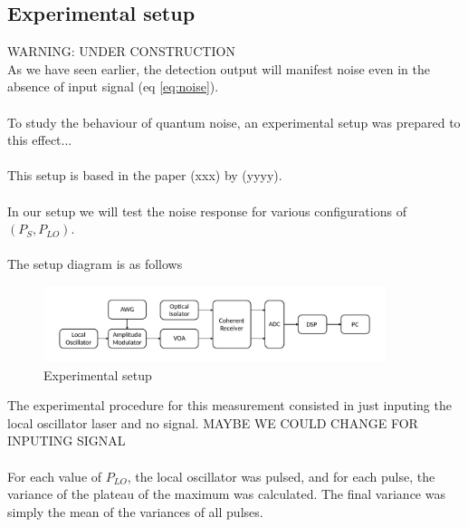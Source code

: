 \subsection{Experimental setup}
%
WARNING: UNDER CONSTRUCTION\\
As we have seen earlier, the detection output will manifest noise even in the absence of input signal (eq \ref{eq:noise}).\\
\\
To study the behaviour of quantum noise, an experimental setup was prepared to this effect...\\
\\
This setup is based in the paper (xxx) by (yyyy).\\
\\
In our setup we will test the noise response for various configurations of  $(P_{S}, P_{LO})$.\\
\\
The setup diagram is as follows
\begin{figure}[H]
	\centering
	\includegraphics[width=10cm]{./sdf/quantum_noise/figures/scheme_experimental.pdf}
	\caption{Experimental setup}
\end{figure}
%
%
The experimental procedure for this measurement consisted in just inputing the local oscillator laser and no signal. MAYBE WE COULD CHANGE FOR INPUTING SIGNAL \\
\\
For each value of  $P_{LO}$, the local oscillator was pulsed, and for each pulse, the variance of the plateau of the maximum was calculated. The final variance was simply the mean of the variances of all pulses.

%
